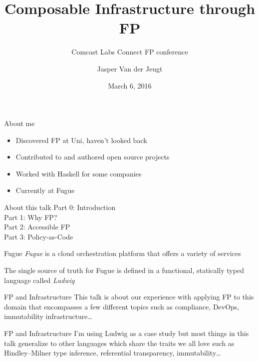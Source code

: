\documentclass[aspectratio=169,20pt]{beamer}
\newcommand{\vspaced}{
    \vspace{5mm}
}
\begin{document}
\title{Composable Infrastructure through FP}
\subtitle{Comcast Labs Connect FP conference}
\author{Jasper Van der Jeugt}
\date{March 6, 2016}

\begin{frame}[plain]
    \titlepage
\end{frame}

\begin{frame}{About me}
    \begin{itemize}
    \item Discovered FP at Uni, haven't looked back
    \item Contributed to and authored open source projects
    \item Worked with Haskell for some companies
    \item Currently at Fugue
    \end{itemize}
\end{frame}

\begin{frame}{About this talk}
    Part 0: Introduction \\
    Part 1: Why FP? \\
    Part 2: Accessible FP \\
    Part 3: Policy-as-Code \\
\end{frame}

\begin{frame}{Fugue}
    \emph{Fugue} is a cloud orchestration platform that offers a variety of
    services \\
    \vspaced
    The single source of truth for Fugue is defined in a functional,
    statically typed language called \emph{Ludwig} \\
\end{frame}

\begin{frame}{FP and Infrastructure}
    This talk is about our experience with applying FP to this domain that
    encompasses a few different topics such as compliance, DevOps, immutability
    infrastructure\ldots
\end{frame}

\begin{frame}{FP and Infrastructure}
    I'm using Ludwig as a case study but most things in this talk generalize to
    other languages which share the traits we all love such as Hindley–Milner
    type inference, referential transparency, immutability\ldots
\end{frame}
\end{document}

